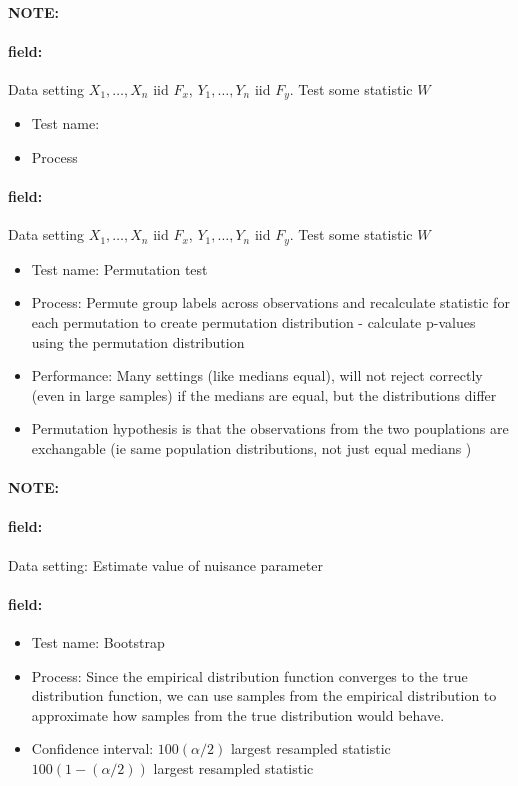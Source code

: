 \documentclass[12pt]{article}
\newenvironment{note}{\paragraph{NOTE:}}{}
\newenvironment{field}{\paragraph{field:}}{}
\begin{document}
\begin{note}
 \begin{field}
  Data setting $X_1, \ldots , X_n$ iid $F_x$, $Y_1, \ldots, Y_n$ iid $F_y$. Test some statistic $W$
  \begin{itemize}
   \item Test name:
   \item Process
  \end{itemize}
 \end{field}
 \begin{field}
  Data setting $X_1, \ldots , X_n$ iid $F_x$, $Y_1, \ldots, Y_n$ iid $F_y$. Test some statistic $W$
  \begin{itemize}
   \item Test name: Permutation test
   \item Process: Permute group labels across observations and recalculate statistic for each permutation to create permutation distribution - calculate p-values using the permutation distribution
   \item Performance: Many settings (like medians equal), will not reject correctly (even in large samples) if the medians are equal, but the distributions differ
   \item Permutation hypothesis is that the observations from the two pouplations are exchangable (ie same population distributions, not just equal medians )
  \end{itemize}
 \end{field}
\end{note}


\begin{note}
 \begin{field}
  Data setting: Estimate value of nuisance parameter
 \end{field}
 \begin{field}
  \begin{itemize}
   \item Test name: Bootstrap
   \item Process: Since the empirical distribution function converges to the true distribution function, we can use samples from the empirical distribution to approximate how samples from the true distribution would behave.
   \item Confidence interval: $100 (\alpha/2)$ largest resampled statistic $100(1 - (\alpha/2))$ largest resampled statistic
  \end{itemize}
 \end{field}
\end{note}
\end{document}
